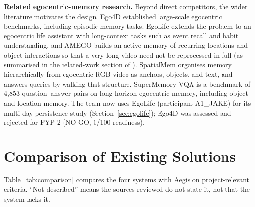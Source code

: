 \textbf{Related egocentric-memory research.} Beyond direct competitors, the
wider literature motivates the design. Ego4D \cite{grauman2022} established
large-scale egocentric benchmarks, including episodic-memory tasks. EgoLife
\cite{egolife2025} extends the problem to an egocentric life assistant with
long-context tasks such as event recall and habit understanding, and AMEGO
\cite{amego2024} builds an active memory of recurring locations and object
interactions so that a very long video need not be reprocessed in full (as
summarised in the related-work section of \cite{r4dsg2026}). SpatialMem
\cite{spatialmem2026} organises memory hierarchically from egocentric RGB video
as anchors, objects, and text, and answers queries by walking that structure.
SuperMemory-VQA \cite{supermemory2026} is a benchmark of 4,853 question--answer
pairs on long-horizon egocentric memory, including object and location memory.
The team now uses EgoLife (participant A1\_JAKE) for its multi-day persistence
study (Section~\ref{sec:egolife}); Ego4D was assessed and rejected for FYP-2
(NO-GO, 0/100 readiness).

\section{Comparison of Existing Solutions}
Table~\ref{tab:comparison} compares the four systems with Aegis on
project-relevant criteria. ``Not described'' means the sources reviewed do not
state it, not that the system lacks it.


